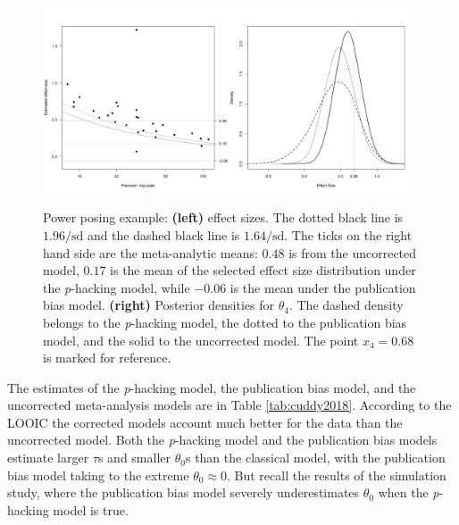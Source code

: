 \documentclass{article}
\theoremstyle{plain}
\theoremstyle{definition}
\begin{document}
\begin{figure}
\noindent \begin{centering}
\includegraphics[width=0.49\textwidth]{plots/cuddy2018}\includegraphics[width=0.49\textwidth]{plots/cuddy2018_posterior}
\par\end{centering}
\caption{\label{fig:cuddy2017} Power posing example: \textbf{(left)} effect sizes. The dotted black line is $1.96/\textrm{sd}$ and the dashed black line is $1.64/\textrm{sd}$. The ticks on the right hand side are
the meta-analytic means: $0.48$ is from the uncorrected model, $0.17$ is the mean of the selected effect size distribution under the \textit{p}-hacking model, while $-0.06$ is the mean under the publication bias model. \textbf{(right)} Posterior densities for $\theta_{4}$. The dashed density belongs to the \textit{p}-hacking model, the dotted to the publication bias model, and the solid to the uncorrected model. The point $x_{4}=0.68$ is marked for reference.}
\end{figure}

The estimates of the \textit{p}-hacking model, the publication bias model, and the uncorrected meta-analysis models are in Table \ref{tab:cuddy2018}. According to the LOOIC the corrected models account much better for the data than the uncorrected model. Both the \textit{p}-hacking model and the publication bias models estimate
larger $\tau$s and smaller $\theta_{0}$s than the classical model, with the publication bias model taking to the extreme $\theta_{0}\approx0$. But recall the results of the simulation study, where the publication bias model severely underestimates $\theta_0$ when the \textit{p}-hacking model is true.
\end{document}
